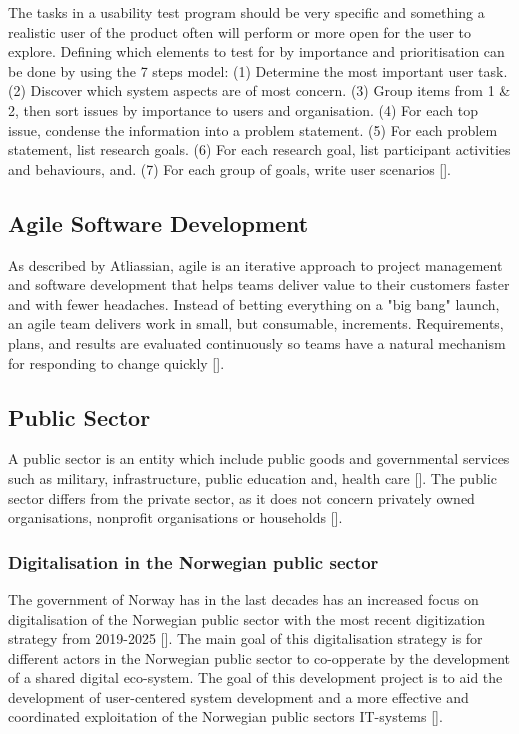 The tasks in a usability test program should be very specific and something a realistic user of the product often will perform or more open for the user to explore. Defining which elements to test for by importance and prioritisation can be done by using the 7 steps model: (1) Determine the most important user task. (2) Discover which system aspects are of most concern. (3) Group items from 1 \& 2, then sort issues by importance to users and organisation. (4) For each top issue, condense the information into a problem statement. (5) For each problem statement, list research goals. (6) For each research goal, list participant activities and behaviours, and. (7) For each group of goals, write user scenarios [\cite{ano_2021}].  

\subsection{Agile Software Development}
As described by Atliassian, agile is an iterative approach to project management and software development that helps teams deliver value to their customers faster and with fewer headaches. Instead of betting everything on a "big bang" launch, an agile team delivers work in small, but consumable, increments. Requirements, plans, and results are evaluated continuously so teams have a natural mechanism for responding to change quickly [\cite{a_2022}]. 

\subsection{Public Sector}
A public sector is an entity which include public goods and governmental services such as military, infrastructure, public education and, health care [\cite{ps_2022}]. The public sector differs from the private sector, as it does not concern privately owned organisations, nonprofit organisations or households [\cite{os_2022}]. 

\subsubsection{Digitalisation in the Norwegian public sector}
The government of Norway has in the last decades has an increased focus on digitalisation of the Norwegian public sector with the most recent digitization strategy from 2019-2025 [\cite{r_2019}]. The main goal of this digitalisation strategy is for different actors in the Norwegian public sector to co-opperate by the development of a shared digital eco-system. The goal of this development project is to aid the development of user-centered system development and a more effective and coordinated exploitation of the Norwegian public sectors IT-systems [\cite{r_2019}].